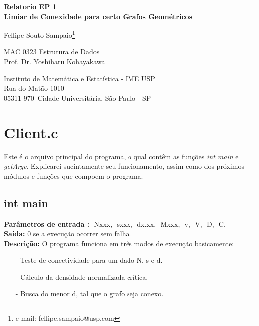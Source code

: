\documentclass[a4paper,11pt]{article}
\begin{document}
\begin{center}{\Large \bf Relatorio EP 1 \\ Limiar de Conexidade para certo Grafos Geométricos}\end{center}
\begin{center}{Fellipe Souto Sampaio\footnote{e-mail: fellipe.sampaio@usp.com}}\end{center}

\begin{center}
MAC 0323 Estrutura de Dados \\
Prof. Dr. Yoshiharu Kohayakawa   \\
             
\end{center}


\begin{center}
Instituto de Matemática e Estatística - IME USP \\
 Rua do Matão 1010 \\
 05311-970\, Cidade Universitária, São Paulo - SP \\
\end{center}

\newpage
\section{Client.c}
  Este é o arquivo principal do programa, o qual contêm as funções \textit{int main} e \textit{getArgv}. Explicarei sucintamente seu funcionamento, assim como dos próximos módulos e funções que compoem o programa. 

\subsection{int main}

\textbf{Parâmetros de entrada :} -Nxxx, -sxxx, -dx.xx, -Mxxx, -v, -V, -D, -C. \\
\textbf{Saída:} 0 se a execução ocorrer sem falha.\\

\textbf{Descrição:}
O programa funciona em três modos de execução basicamente: 

\begin{enumerate}
\item[-] Teste de conectividade para um dado N, s e d.
\item[-] Cálculo da densidade normalizada crítica.
\item[-] Busca do menor d, tal que o grafo seja conexo.
\end{enumerate}
\end{document}
